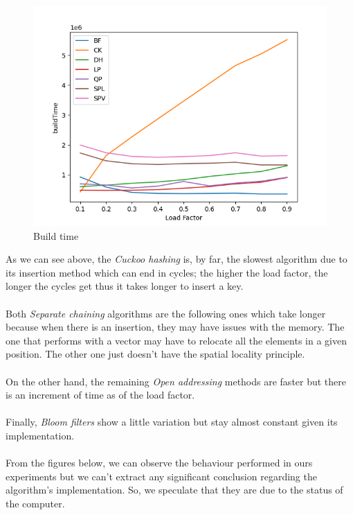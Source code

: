\documentclass{article}
\begin{document}
        \begin{figure}[!h]
        \begin{center}
          \includegraphics[width=\linewidth]{images/loadFactor_vs_buildTime.png}
          \caption{Build time}\label{fig:plot1}
        \endminipage
        \end{center}
        \end{figure}
    
    As we can see above, the \textit{Cuckoo hashing} is, by far, the slowest algorithm due to its insertion method which can end in cycles; the higher the load factor, the longer the cycles get thus it takes longer to insert a key. \\\\
    Both \textit{Separate chaining} algorithms are the following ones which take longer because when there is an insertion, they may have issues with the memory. The one that performs with a vector may have to relocate all the elements in a given position. The other one just doesn't have the spatial locality principle. \\\\
    On the other hand, the remaining \textit{Open addressing} methods are faster but there is an increment of time as of the load factor. \\\\
    Finally, \textit{Bloom filters} show a little variation but stay almost constant given its implementation. \\\\
    
    From the figures below, we can observe the behaviour performed in ours experiments but we can't extract any significant conclusion regarding the algorithm's implementation. So, we speculate that they are due to the status of the computer.
    
\end{document}
